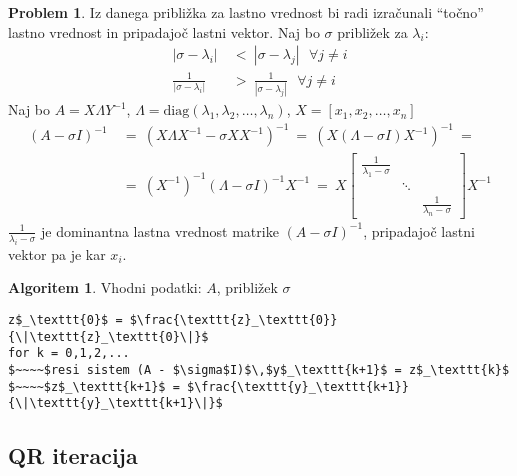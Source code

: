 \documentclass[11pt]{article}
\theoremstyle{definition}
\theoremstyle{definition}
\newtheorem{problem}{Problem}[section]
\newtheorem*{algoritem}{Algoritem}
\begin{document}
\begin{problem}

Iz danega približka za lastno vrednost bi radi izračunali ``točno'' lastno vrednost in pripadajoč lastni vektor. Naj bo $\sigma$ približek za $\lambda_i$:
\begin{align*}
|\sigma - \lambda_i| ~&<~ |\sigma - \lambda_j| ~~~\forall j \neq i \\
\frac{1}{|\sigma - \lambda_i|} ~&>~ \frac{1}{|\sigma - \lambda_j|} ~~~\forall j \neq i
\end{align*}
Naj bo $A = X \Lambda Y^{-1}$, $\Lambda = \text{diag}(\lambda_1, \lambda_2, \ldots, \lambda_n)$, $X = [x_1, x_2, \ldots, x_n]$
\begin{align*}
(A - \sigma I)^{-1} ~&=~ (X \Lambda X^{-1} - \sigma X X^{-1})^{-1} ~=~ (X(\Lambda - \sigma I)X^{-1})^{-1} ~= \\
~&=~ (X^{-1})^{-1} (\Lambda - \sigma I)^{-1} X^{-1} ~=~ X \begin{bmatrix}
\frac{1}{\lambda_1 - \sigma} & ~ & ~ \\
~ & \ddots & ~ \\
~ & ~ & \frac{1}{\lambda_n - \sigma}
\end{bmatrix} X^{-1}
\end{align*}
$\frac{1}{\lambda_i - \sigma}$ je dominantna lastna vrednost matrike $(A - \sigma I)^{-1}$, pripadajoč lastni vektor pa je kar $x_i$.

\end{problem}
\vspace{0.5cm}

\pagebreak
\begin{algoritem}

Vhodni podatki: $A$, približek  $\sigma$
\begin{lstlisting}
z$_\texttt{0}$ = $\frac{\texttt{z}_\texttt{0}}{\|\texttt{z}_\texttt{0}\|}$
for k = 0,1,2,...
$~~~~$resi sistem (A - $\sigma$I)$\,$y$_\texttt{k+1}$ = z$_\texttt{k}$
$~~~~$z$_\texttt{k+1}$ = $\frac{\texttt{y}_\texttt{k+1}}{\|\texttt{y}_\texttt{k+1}\|}$
\end{lstlisting}

\end{algoritem}
\vspace{0.5cm}


\subsection{QR iteracija}
\vspace{0.5cm}
\end{document}
